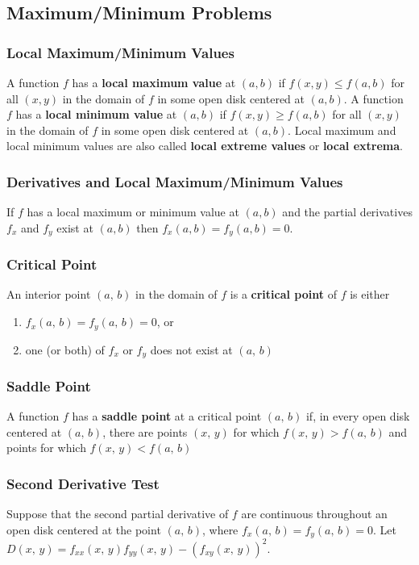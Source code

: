 \subsection{Maximum/Minimum Problems}
\subsubsection{Local Maximum/Minimum Values}
A function $f$ has a \textbf{local maximum value} at $(a, b)$ if $f(x, y) \leq f(a, b)$ for all $(x, y)$ in the domain of $f$ in some open disk centered at $(a, b)$. A function $f$ has a \textbf{local minimum value} at $(a, b)$ if $f(x, y) \geq f(a, b)$ for all $(x, y)$ in the domain of $f$ in some open disk centered at $(a, b)$. Local maximum and local minimum values are also called \textbf{local extreme values} or \textbf{local extrema}.

\subsubsection{Derivatives and Local Maximum/Minimum Values}
If $f$ has a local maximum or minimum value at $(a, b)$ and the partial derivatives $f_x$ and $f_y$ exist at $(a, b)$ then $f_x (a, b) = f_y(a, b) = 0$.

\subsubsection{Critical Point}
An interior point $(a,\, b)$ in the domain of $f$ is a \textbf{critical point} of $f$ is either

\begin{enumerate}
    \item $f_x (a,\, b) = f_y (a,\, b) = 0$, or
    \item one (or both) of $f_x$ or $f_y$ does not exist at $(a,\, b)$
\end{enumerate}

\subsubsection{Saddle Point}
A function $f$ has a \textbf{saddle point} at a critical point $(a,\, b)$ if, in every open disk centered at $(a,\, b)$, there are points $(x,\, y)$ for which $f(x,\, y) > f(a,\, b)$ and points for which $f(x,\, y) < f(a,\, b)$

\subsubsection{Second Derivative Test}
Suppose that the second partial derivative of $f$ are continuous throughout an open disk centered at the point $(a,\, b)$, where $f_x (a,\, b) = f_y (a,\, b) = 0$. Let $D(x,\, y) = f_{xx} (x,\, y) f_{yy} (x,\, y) - (f_{xy} (x,\, y))^2$.

